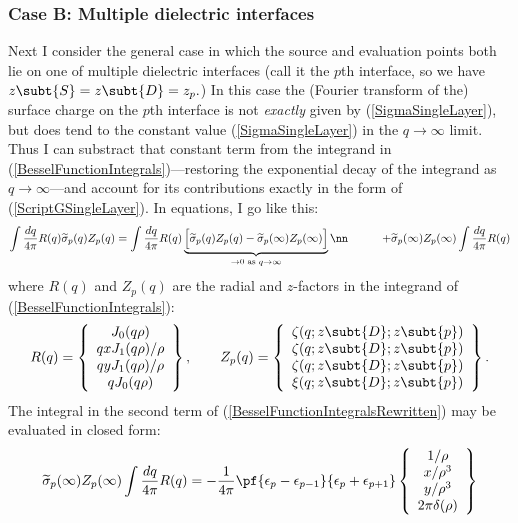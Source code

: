 \documentclass[letterpaper]{article}
\renewcommand{\wt}{\widetilde}
\begin{document}
\subsubsection*{Case B: Multiple dielectric interfaces}

Next I consider the general case in which the source and evaluation points
both lie on one of multiple dielectric interfaces
(call it the $p$th interface, so we have $z\subt{S}=z\subt{D}=z_p.$)
In this case the (Fourier transform of the) surface charge on the $p$th
interface is not \textit{exactly} given by (\ref{SigmaSingleLayer}), but
does tend to the constant value (\ref{SigmaSingleLayer}) in the 
$q\to\infty$ limit. Thus I can substract that constant term from
the integrand in (\ref{BesselFunctionIntegrals})---restoring
the exponential decay of the integrand as $q\to \infty$---and
account for its contributions exactly in the form of 
(\ref{ScriptGSingleLayer}). In equations, I go like this:
\begin{align}
 \int \frac{dq}{4\pi} R(q)
 \wt\sigma_p(q) Z_p(q)
&= 
 \int \frac{dq}{4\pi} R(q)
 \underbrace{
 \Big[\wt \sigma_p(q)Z_p(q) - \wt \sigma_p(\infty)Z_p(\infty)\Big]
            }_{\to 0 \text{ as } q\to \infty}
\nn
&\qquad + \wt\sigma_p(\infty)Z_p(\infty)
  \int \frac{dq}{4\pi} R(q)
\label{BesselFunctionIntegralsRewritten}
\end{align}
where $R(q)$ and $Z_p(q)$ are the radial and $z$-factors in
the integrand of (\ref{BesselFunctionIntegrals}):
$$R(q)=
   \left\{ 
     \begin{array}{c}
        J_0(q\rho)       \\ 
      qxJ_1(q\rho)/\rho  \\
      qyJ_1(q\rho)/\rho  \\
      qJ_0(q\rho)
     \end{array}
   \right\}, 
 \qquad 
  Z_p(q)=
   \left\{ 
     \begin{array}{c}
      \zeta(q;z\subt{D};z\subt{p}) \\
      \zeta(q;z\subt{D};z\subt{p}) \\
      \zeta(q;z\subt{D};z\subt{p}) \\
      \xi(q;z\subt{D};z\subt{p})
     \end{array}
   \right\}.
$$
The integral in the second
term of (\ref{BesselFunctionIntegralsRewritten}) may be
evaluated in closed form:
$$ \wt\sigma_p(\infty) Z_p(\infty)
   \int \frac{dq}{4\pi} R(q)
   = -\frac{1}{4\pi}
      \pf{\epsilon_p - \epsilon_{p-1}}{\epsilon_p + \epsilon_{p+1}}
      \left\{\begin{array}{c}
          1/\rho   \\
          x/\rho^3 \\
          y/\rho^3 \\
          2\pi\delta(\rho)
      \end{array}\right\}
$$
\end{document}
